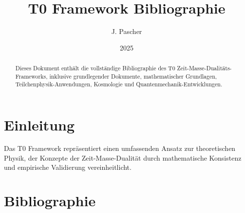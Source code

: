 \documentclass{article}
\begin{document}
	
	\title{T0 Framework Bibliographie}
	\author{J. Pascher}
	\date{2025}
	\maketitle
	
	\begin{abstract}
		Dieses Dokument enthält die vollständige Bibliographie des T0 Zeit-Masse-Dualitäts-Frameworks, inklusive grundlegender Dokumente, mathematischer Grundlagen, Teilchenphysik-Anwendungen, Kosmologie und Quantenmechanik-Entwicklungen.
	\end{abstract}
	
	\tableofcontents
	
	\section{Einleitung}
	Das T0 Framework repräsentiert einen umfassenden Ansatz zur theoretischen Physik, der Konzepte der Zeit-Masse-Dualität durch mathematische Konsistenz und empirische Validierung vereinheitlicht.
	
	\section{Bibliographie}
	
\end{document}
